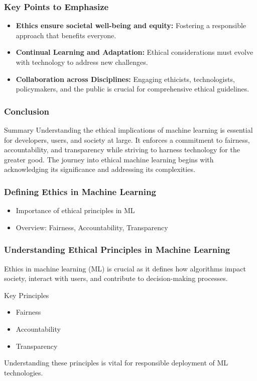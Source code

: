 \documentclass{beamer}
\begin{document}
\begin{frame}[fragile]
    \frametitle{Key Points to Emphasize}
    \begin{itemize}
        \item \textbf{Ethics ensure societal well-being and equity:} Fostering a responsible approach that benefits everyone.
        \item \textbf{Continual Learning and Adaptation:} Ethical considerations must evolve with technology to address new challenges.
        \item \textbf{Collaboration across Disciplines:} Engaging ethicists, technologists, policymakers, and the public is crucial for comprehensive ethical guidelines.
    \end{itemize}
\end{frame}

\begin{frame}[fragile]
    \frametitle{Conclusion}
    \begin{block}{Summary}
        Understanding the ethical implications of machine learning is essential for developers, users, and society at large. 
        It enforces a commitment to fairness, accountability, and transparency while striving to harness technology for the greater good. 
        The journey into ethical machine learning begins with acknowledging its significance and addressing its complexities.
    \end{block}
\end{frame}

\begin{frame}[fragile]
    \frametitle{Defining Ethics in Machine Learning}
    \begin{itemize}
        \item Importance of ethical principles in ML
        \item Overview: Fairness, Accountability, Transparency
    \end{itemize}
\end{frame}

\begin{frame}[fragile]
    \frametitle{Understanding Ethical Principles in Machine Learning}
    Ethics in machine learning (ML) is crucial as it defines how algorithms impact society, interact with users, and contribute to decision-making processes. 
    \begin{block}{Key Principles}
        \begin{itemize}
            \item Fairness
            \item Accountability
            \item Transparency
        \end{itemize}
    \end{block}
    Understanding these principles is vital for responsible deployment of ML technologies.
\end{frame}
\end{document}
